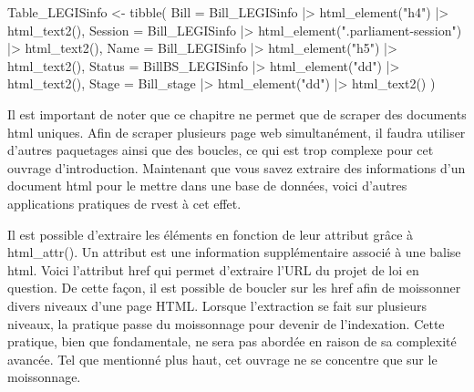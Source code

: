 \documentclass[
  letterpaper,
  DIV=11,
  numbers=noendperiod]{scrreprt}
\newenvironment{Shaded}{\begin{snugshade}}{\end{snugshade}}
\newcommand{\ErrorTok}[1]{\textcolor[rgb]{0.68,0.00,0.00}{#1}}
\newcommand{\ExtensionTok}[1]{\textcolor[rgb]{0.00,0.23,0.31}{#1}}
\newcommand{\KeywordTok}[1]{\textcolor[rgb]{0.00,0.23,0.31}{#1}}
\newcommand{\NormalTok}[1]{\textcolor[rgb]{0.00,0.23,0.31}{#1}}
\newcommand{\OperatorTok}[1]{\textcolor[rgb]{0.37,0.37,0.37}{#1}}
\newcommand{\StringTok}[1]{\textcolor[rgb]{0.13,0.47,0.30}{#1}}
\begin{document}
\begin{Shaded}
\begin{Highlighting}[]
\ExtensionTok{Table\_LEGISinfo} \OperatorTok{\textless{}}\NormalTok{{-} tibble}\ErrorTok{(}
  \ExtensionTok{Bill}\NormalTok{ = Bill\_LEGISinfo }\KeywordTok{|}\OperatorTok{\textgreater{}}\NormalTok{ html\_element}\KeywordTok{(}\StringTok{"h4"}\KeywordTok{)} \KeywordTok{|}\OperatorTok{\textgreater{}}\NormalTok{ html\_text2}\KeywordTok{()}\ExtensionTok{,}
  \ExtensionTok{Session}\NormalTok{ = Bill\_LEGISinfo }\KeywordTok{|}\OperatorTok{\textgreater{}}\NormalTok{ html\_element}\KeywordTok{(}\StringTok{".parliament{-}session"}\KeywordTok{)} \KeywordTok{|}\OperatorTok{\textgreater{}}\NormalTok{ html\_text2}\KeywordTok{()}\ExtensionTok{,}
  \ExtensionTok{Name}\NormalTok{ = Bill\_LEGISinfo }\KeywordTok{|}\OperatorTok{\textgreater{}}\NormalTok{ html\_element}\KeywordTok{(}\StringTok{"h5"}\KeywordTok{)} \KeywordTok{|}\OperatorTok{\textgreater{}}\NormalTok{ html\_text2}\KeywordTok{()}\ExtensionTok{,}
  \ExtensionTok{Status}\NormalTok{ = BillBS\_LEGISinfo }\KeywordTok{|}\OperatorTok{\textgreater{}}\NormalTok{ html\_element}\KeywordTok{(}\StringTok{"dd"}\KeywordTok{)} \KeywordTok{|}\OperatorTok{\textgreater{}}\NormalTok{ html\_text2}\KeywordTok{()}\ExtensionTok{,}
  \ExtensionTok{Stage}\NormalTok{ = Bill\_stage }\KeywordTok{|}\OperatorTok{\textgreater{}}\NormalTok{ html\_element}\KeywordTok{(}\StringTok{"dd"}\KeywordTok{)} \KeywordTok{|}\OperatorTok{\textgreater{}}\NormalTok{ html\_text2}\KeywordTok{()}
\KeywordTok{)}
\end{Highlighting}
\end{Shaded}

Il est important de noter que ce chapitre ne permet que de scraper des
documents html uniques. Afin de scraper plusieurs page web
simultanément, il faudra utiliser d'autres paquetages ainsi que des
boucles, ce qui est trop complexe pour cet ouvrage d'introduction.
Maintenant que vous savez extraire des informations d'un document html
pour le mettre dans une base de données, voici d'autres applications
pratiques de rvest à cet effet.

Il est possible d'extraire les éléments en fonction de leur attribut
grâce à html\_attr(). Un attribut est une information supplémentaire
associé à une balise html. Voici l'attribut href qui permet d'extraire
l'URL du projet de loi en question. De cette façon, il est possible de
boucler sur les href afin de moissonner divers niveaux d'une page HTML.
Lorsque l'extraction se fait sur plusieurs niveaux, la pratique passe du
moissonnage pour devenir de l'indexation. Cette pratique, bien que
fondamentale, ne sera pas abordée en raison de sa complexité avancée.
Tel que mentionné plus haut, cet ouvrage ne se concentre que sur le
moissonnage.
\end{document}
